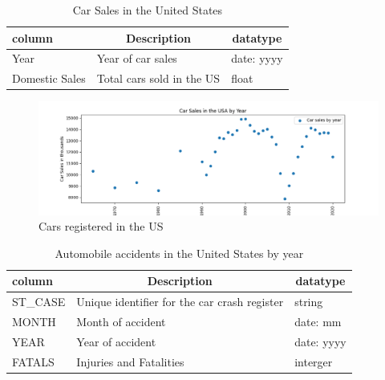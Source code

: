 \documentclass[
  man,floatsintext]{apa7}
\begin{document}
\begin{table}[tbp]

\begin{center}
\begin{threeparttable}

\caption{\label{tab:car-registration-schema}Car Sales in the United States}

\begin{tabular}{lll}
\toprule
column & \multicolumn{1}{c}{Description} & \multicolumn{1}{c}{datatype}\\
\midrule
Year & Year of car sales & date: yyyy\\
Domestic Sales & Total cars sold in the US & float\\
\bottomrule
\end{tabular}

\end{threeparttable}
\end{center}

\end{table}

\begin{figure}

{\centering \includegraphics{./graphs/car_sales} 

}

\caption{Cars registered in the US}\label{fig:car-registered}
\end{figure}

\begin{table}[tbp]

\begin{center}
\begin{threeparttable}

\caption{\label{tab:car-accidents-schema}Automobile accidents in the United States by year}

\begin{tabular}{lll}
\toprule
column & \multicolumn{1}{c}{Description} & \multicolumn{1}{c}{datatype}\\
\midrule
ST\_CASE & Unique identifier for the car crash register & string\\
MONTH & Month of accident & date: mm\\
YEAR & Year of accident & date: yyyy\\
FATALS & Injuries and Fatalities & interger\\
\bottomrule
\end{tabular}

\end{threeparttable}
\end{center}

\end{table}
\end{document}
